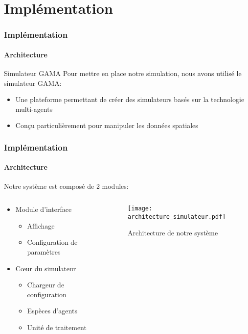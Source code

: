 \section{Implémentation}\label{implementation}
\begin{frame}
    \frametitle{Implémentation}
    \framesubtitle{Architecture}

    \begin{block}{Simulateur GAMA}
        Pour mettre en place notre simulation, nous avons utilisé le simulateur GAMA:
        \begin{itemize}
            \item Une plateforme permettant de créer des simulateurs basés sur la technologie multi-agents
            \item Conçu particulièrement pour manipuler les données spatiales
        \end{itemize}

    \end{block}

\end{frame}


\begin{frame}[shrink]
    \frametitle{Implémentation}
    \framesubtitle{Architecture}
    Notre système est composé de 2 modules:

    \begin{columns}[c]
        \begin{column}{0.45\textwidth}
            \begin{itemize}
                \item Module d'interface
                \begin{itemize}
                    \item Affichage
                    \item Configuration de paramètres
                \end{itemize}
                \item C\oe ur du simulateur
                \begin{itemize}
                    \item Chargeur de configuration
                    \item Espèces d'agents
                    \item Unité de traitement
                \end{itemize}
            \end{itemize}

        \end{column}
        \pause{}%
        \begin{column}{0.45\textwidth}
            \begin{figure}[h]
                \centering
                \texttt{[image: architecture\_simulateur.pdf]}
                \caption{Architecture de notre système}
                \label{fig:architecture-simulateur}
            \end{figure}
        \end{column}
    \end{columns}

\end{frame}

